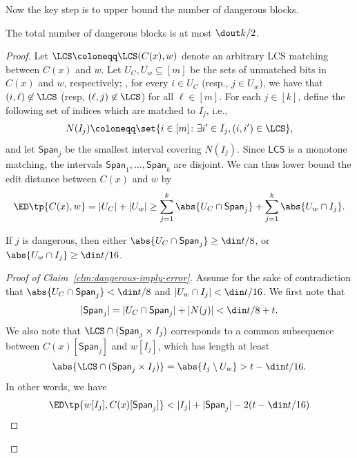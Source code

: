 Now the key step is to upper bound the number of dangerous blocks.

\begin{lemma} \label{lem:dangerous-ub}
	The total number of dangerous blocks is at most $\dout k/2$.
\end{lemma}
\begin{proof}
	Let $\LCS \coloneqq \LCS(C(x), w)$ denote an arbitrary LCS matching between $C(x)$ and $w$. 
	Let $U_C, U_w \subseteq [m]$ be the sets of unmatched bits in $C(x)$ and $w$, respectively; \ie, for every $i \in U_C$ (resp., $j \in U_w$), we have that $(i,\ell) \not\in \LCS$ (resp, $(\ell, j) \not\in \LCS$) for all $\ell \in [m]$.
	For each $j \in [k]$, define the following set of indices which are matched to $I_j$, i.e.,
	\begin{align*}
		N(I_j) \coloneqq \set{i \in [m] \colon \exists i' \in I_j, (i,i') \in \LCS},
	\end{align*}
	and let $\textsf{Span}_j$ be the smallest interval covering $N(I_j)$. Since $\textsf{LCS}$ is a monotone matching, the intervals $\textsf{Span}_1, \dots, \textsf{Span}_k$ are disjoint. 
	We can thus lower bound the edit distance between $C(x)$ and $w$ by
	\begin{align*}
	\ED\tp{C(x), w} = |U_C| + |U_w| \ge \sum_{j=1}^{k}\abs{U_C \cap \textsf{Span}_j} + \sum_{j=1}^{k}\abs{U_w \cap I_j}.
	\end{align*}
	\begin{claim} \label{clm:dangerous-imply-error}
		If $j$ is dangerous, then either $\abs{U_C \cap \textsf{Span}_j} \ge \din t/8$, or $\abs{U_w \cap I_j} \ge \din t/16$.
	\end{claim}
	\begin{proof}[Proof of Claim~\ref{clm:dangerous-imply-error}]
		Assume for the sake of contradiction that  $\abs{U_C \cap \textsf{Span}_j} < \din t/8$ and $|U_w \cap I_j| < \din t/16$. We first note that
		\begin{align*}
		|\textsf{Span}_j| = |U_C \cap \textsf{Span}_j| + |N(j)| < \din t/8 + t.
		\end{align*}
		We also note that $\LCS \cap (\textsf{Span}_j \times I_j)$ corresponds to a common subsequence between $C(x)[\textsf{Span}_j]$ and $w[I_j]$, which has length at least
		\begin{align*}
			\abs{\LCS \cap (\textsf{Span}_j \times I_j)} = \abs{I_j \setminus U_w} > t-\din t/16.
		\end{align*}
		In other words, we have
		\begin{align*}
			\ED\tp{w[{I_j}], C(x)[{\textsf{Span}_j}]} &< |I_j| + |\textsf{Span}_j| - 2(t-\din t/16) \\ 

\end{align*}
\end{proof}
\end{proof}
